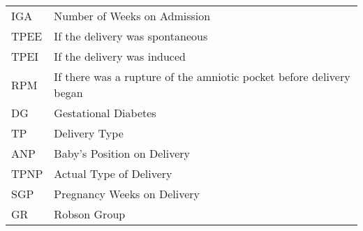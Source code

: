 \begin{table}[H]
\begin{tabular}{ l   l }
IGA  & Number of Weeks on Admission \\
TPEE  & If the delivery was spontaneous   \\
TPEI  &  If the delivery was induced  \\
RPM  & If there was a rupture of the amniotic pocket before delivery began \\
DG &  Gestational Diabetes \\
TP & Delivery Type \\
ANP  & Baby's Position on Delivery \\
TPNP  & Actual Type of Delivery\\
SGP  & Pregnancy Weeks on Delivery \\
GR  &   Robson Group \\
\bottomrule
\end{tabular}
\end{table}
